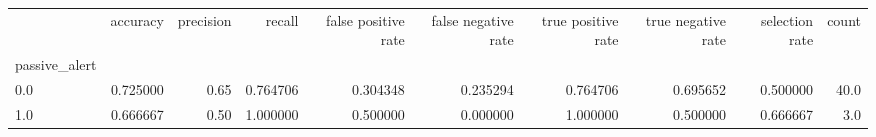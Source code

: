 \begin{tabular}{lrrrrrrrrr}
\toprule
{} &  accuracy &  precision &    recall &  false positive rate &  false negative rate &  true positive rate &  true negative rate &  selection rate &  count \\
passive\_alert &           &            &           &                      &                      &                     &                     &                 &        \\
\midrule
0.0           &  0.725000 &       0.65 &  0.764706 &             0.304348 &             0.235294 &            0.764706 &            0.695652 &        0.500000 &   40.0 \\
1.0           &  0.666667 &       0.50 &  1.000000 &             0.500000 &             0.000000 &            1.000000 &            0.500000 &        0.666667 &    3.0 \\
\bottomrule
\end{tabular}
